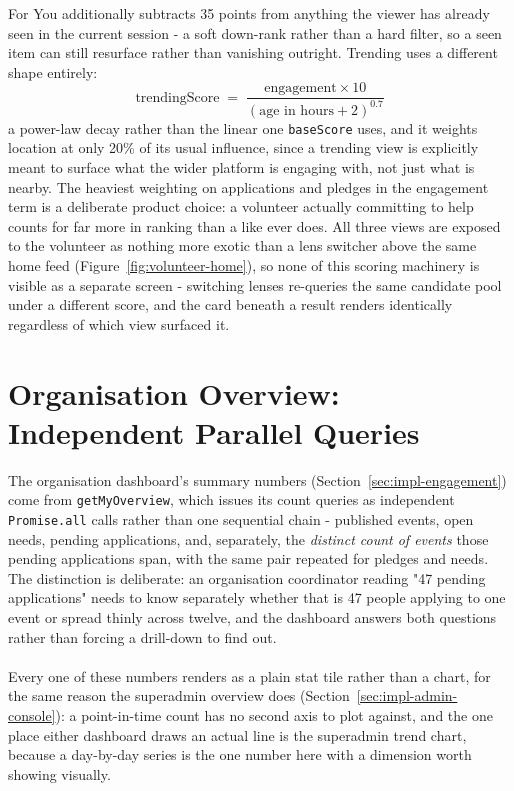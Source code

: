 \noindent For You additionally subtracts 35 points from anything the viewer has already seen in the current session - a soft down-rank rather than a hard filter, so a seen item can still resurface rather than vanishing outright. Trending uses a different shape entirely:
\[
\text{trendingScore} \;=\; \frac{\text{engagement} \times 10}{(\text{age in hours} + 2)^{0.7}}
\]
a power-law decay rather than the linear one \texttt{baseScore} uses, and it weights location at only 20\% of its usual influence, since a trending view is explicitly meant to surface what the wider platform is engaging with, not just what is nearby. The heaviest weighting on applications and pledges in the engagement term is a deliberate product choice: a volunteer actually committing to help counts for far more in ranking than a like ever does. All three views are exposed to the volunteer as nothing more exotic than a lens switcher above the same home feed (Figure~\ref{fig:volunteer-home}), so none of this scoring machinery is visible as a separate screen - switching lenses re-queries the same candidate pool under a different score, and the card beneath a result renders identically regardless of which view surfaced it.

\section{Organisation Overview: Independent Parallel Queries}
\label{sec:deepdive-overview}
The organisation dashboard's summary numbers (Section~\ref{sec:impl-engagement}) come from \texttt{getMyOverview}, which issues its count queries as independent \texttt{Promise.all} calls rather than one sequential chain - published events, open needs, pending applications, and, separately, the \emph{distinct count of events} those pending applications span, with the same pair repeated for pledges and needs. The distinction is deliberate: an organisation coordinator reading "47 pending applications" needs to know separately whether that is 47 people applying to one event or spread thinly across twelve, and the dashboard answers both questions rather than forcing a drill-down to find out. \noindent \\ \\ Every one of these numbers renders as a plain stat tile rather than a chart, for the same reason the superadmin overview does (Section~\ref{sec:impl-admin-console}): a point-in-time count has no second axis to plot against, and the one place either dashboard draws an actual line is the superadmin trend chart, because a day-by-day series is the one number here with a dimension worth showing visually.

